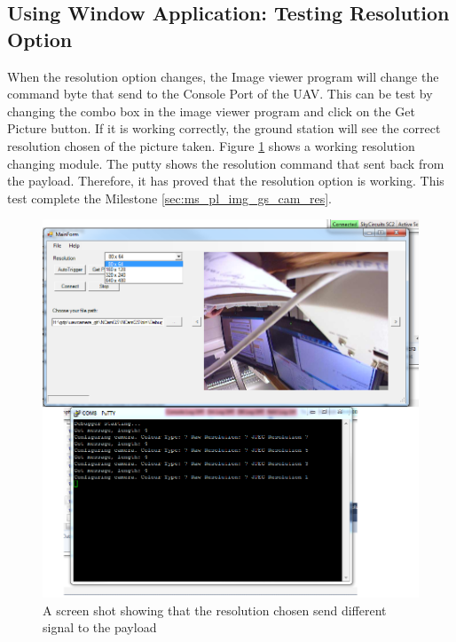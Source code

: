 \subsection{Using Window Application: Testing Resolution Option}
\label{test_res_op}
When the resolution option changes, the Image viewer program will change the command byte that send to the Console Port of the UAV. 
This can be test by changing the combo box in the image viewer program and click on the Get Picture button.
If it is working correctly, the ground station will see the correct resolution chosen of the picture taken.
Figure \ref{resolution testing} shows a working resolution changing module. 
The putty shows the resolution command that sent back from the payload.
Therefore, it has proved that the resolution option is working.
This test complete the Milestone \ref{sec:ms_pl_img_gs_cam_res}.
\begin{figure}[H]
\begin{center}
\includegraphics[width=1.00\textwidth]{testing_screenshots/change_res_ncam_1.png} 
\end{center}
\caption{A screen shot showing that the resolution chosen send different signal to the payload\label{resolution testing}}
\end{figure}

